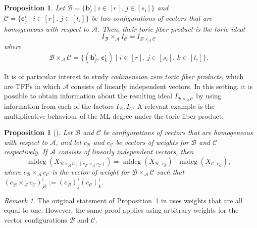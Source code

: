\documentclass[12pt,reqno]{amsart}   	%
\theoremstyle{plain}
\newtheorem{proposition}[theorem]{Proposition}
\theoremstyle{definition}
\theoremstyle{remark}
\newtheorem{remark}[theorem]{Remark}
\newcommand{\mldeg}{\operatorname{mldeg}}
\begin{document}
\begin{proposition}
    Let $\mathcal{B} = \{\mathbf{b}^i_j \mid i \in [r],\,j \in [s_i]\}$ and $\mathcal{C} = \{\mathbf{c}^i_j \mid i \in [r],\,j \in [t_i]\}$ be two configurations of vectors that are homogeneous with respect to $\mathcal{A}$. Then, their toric fiber product is the toric ideal
    \[
    I_{\mathcal{B}} \times_{\mathcal{A}} I_{\mathcal{C}} = I_{\mathcal{B \times_{\mathcal{A}}\mathcal{C}}}
    \]
    where
    \[
    \mathcal{B \times_{\mathcal{A}}\mathcal{C}} = \{ (\mathbf{b}^i_j,\,\mathbf{c}^i_k)\mid i \in [r],\, j \in [s_i],\, k \in [t_i]\}.
    \]
\end{proposition}

It is of particular interest to study \textit{codimension zero toric fiber products}, which are TFPs in which $\mathcal{A}$ consists of linearly independent vectors. In this setting, it is possible to obtain information about the resulting ideal $I_{\mathcal{B \times_{\mathcal{A}}\mathcal{C}}}$ 
by using information from each of the factors $I_{\mathcal{B}},I_{\mathcal{C}}$. A relevant example is the multiplicative behaviour of the ML degree under the toric fiber product.

\begin{proposition}[\cite{AKK20}] \label{prop:mldeg_for_tfp}
    Let $\mathcal{B}$ and $\mathcal{C}$ be configurations of vectors that are homogeneous with respect to $\mathcal{A}$, and let $c_{\mathcal{B}}$ and $c_{\mathcal{C}}$ be vectors of weights for $\mathcal{B}$ and $\mathcal{C}$ respectively. If $\mathcal{A}$ consists of linearly independent vectors, then 
    \[
    \mldeg (X_{\mathcal{B}\times_\mathcal{A}\mathcal{C},\,(c_{\mathcal{B}}\times_{\mathcal{A}} c_{\mathcal{C}})}) = \mldeg (X_{\mathcal{B},\,c_{\mathcal{B}}}) \cdot \mldeg(X_{\mathcal{C},\,c_{\mathcal{C}}}),
    \]
    where $c_{\mathcal{B}}\times_{\mathcal{A}} c_{\mathcal{C}}$ is the vector of weight for $\mathcal{B}\times_\mathcal{A}\mathcal{C}$ such that $(c_{\mathcal{B}}\times_{\mathcal{A}} c_{\mathcal{C}})^i_{jk}:=(c_{\mathcal{B}})^i_j (c_{\mathcal{C}})^i_k$.
\end{proposition}
\begin{remark}
    The original statement of Proposition~\ref{prop:mldeg_for_tfp} in \cite{AKK20} uses weights that are all equal to one. However, the same proof applies using arbitrary weights for the vector configurations $\mathcal{B}$ and $\mathcal{C}$. %
\end{remark}
\end{document}
